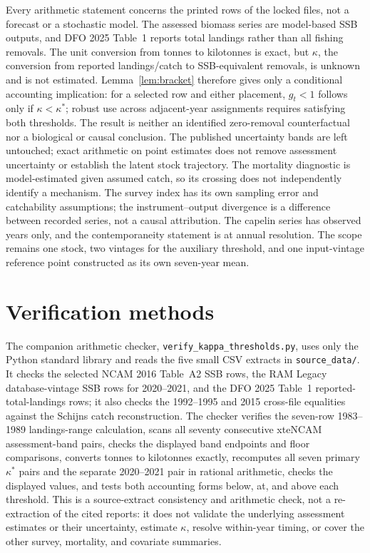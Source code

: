 \documentclass[10pt,twocolumn]{article}
\theoremstyle{plain}
\theoremstyle{remark}
\begin{document}
Every arithmetic statement concerns the printed rows of the locked
files, not a forecast or a stochastic model. The assessed biomass
series are model-based SSB outputs, and DFO 2025 Table~1 reports total
landings rather than all fishing removals. The unit conversion from
tonnes to kilotonnes is exact, but \(\kappa\), the conversion from
reported landings/catch to SSB-equivalent removals, is unknown and is
not estimated. Lemma~\ref{lem:bracket} therefore gives only a
conditional accounting implication: for a selected row and either
placement, \(g_t<1\) follows only if \(\kappa<\kappa^*\); robust use
across adjacent-year assignments requires satisfying both thresholds.
The result is neither an identified zero-removal counterfactual nor a
biological or causal conclusion. The published uncertainty bands are
left untouched; exact arithmetic on point estimates does not remove
assessment uncertainty or establish the latent stock trajectory. The
mortality diagnostic is model-estimated given assumed catch, so its
crossing does not independently identify a mechanism. The survey index
has its own sampling error and catchability assumptions; the
instrument--output divergence is a difference between recorded series,
not a causal attribution. The capelin series has observed years only,
and the contemporaneity statement is at annual resolution. The scope
remains one stock, two vintages for the auxiliary threshold, and one
input-vintage reference point constructed as its own seven-year mean.

\section{Verification methods}\label{methods}

The companion arithmetic checker,
\texttt{verify\_kappa\_thresholds.py}, uses only the Python
standard library and reads the five small CSV extracts in
\texttt{source\_data/}. It checks the selected NCAM 2016 Table~A2 SSB
rows, the RAM Legacy database-vintage SSB rows for 2020--2021, and the
DFO 2025 Table~1 reported-total-landings rows; it also checks the
1992--1995 and 2015 cross-file equalities against the Schijns catch
reconstruction. The checker verifies the seven-row 1983--1989
landings-range calculation, scans all seventy consecutive xteNCAM
assessment-band pairs, checks the displayed band endpoints and floor
comparisons, converts tonnes to kilotonnes exactly, recomputes all seven
primary \(\kappa^*\) pairs and the separate 2020--2021 pair in rational
arithmetic, checks the displayed values, and tests both accounting
forms below, at, and above each threshold. This is a source-extract
consistency and arithmetic check, not a re-extraction of the cited
reports: it does not validate the underlying assessment estimates or
their uncertainty, estimate \(\kappa\), resolve within-year timing, or
cover the other survey, mortality, and covariate summaries.
\end{document}

